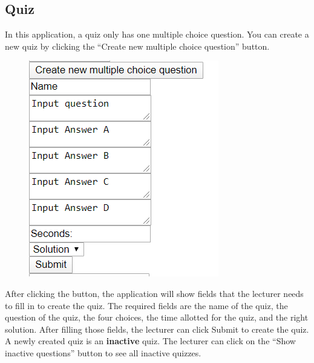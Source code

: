\documentclass[a4paper, 11pt,openany]{book} %
\begin{document}
\subsection{Quiz}
In this application, a quiz only has one multiple choice question. You can create a new quiz by clicking the “Create new multiple choice question” button.
\begin{figure}[H]
    \centering
    \includegraphics[width=\textwidth,height=\textheight,keepaspectratio]{images/15.png}
\end{figure}
After clicking the button, the application will show fields that the lecturer needs to fill in to create the quiz. The required fields are the name of the quiz, the question of the quiz, the four choices, the time allotted for the quiz, and the right solution. After filling those fields, the lecturer can click Submit to create the quiz. A newly created quiz is an \textbf{inactive} quiz. The lecturer can click on the “Show inactive questions” button to see all inactive quizzes.
\end{document}
